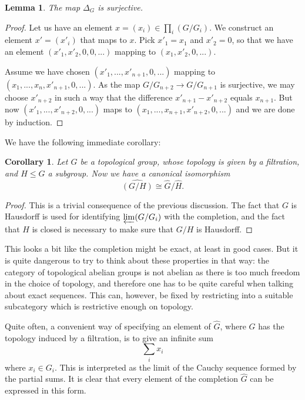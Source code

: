 \documentclass[12pt,a4paper,leqno]{article}
\newcommand{\plim}{\varprojlim}
\theoremstyle{plain}
\newtheorem{lem}[theo]{Lemma}
\newtheorem{cor}[theo]{Corollary}
\theoremstyle{definition}
\theoremstyle{remark}
\begin{document}
\begin{lem}
The map $\Delta_G$ is surjective. 
\end{lem}
\begin{proof}
Let us have an element $x = (x_i) \in \prod_i (G / G_i)$. We construct an element $x' = (x'_i)$ that maps to $x$. Pick $x'_1 = x_1$  and $x'_2 = 0$, so that we have an element $(x'_1, x'_2, 0, 0, ...)$ mapping to $(x_1, x'_2, 0, ...)$.

Assume we have chosen $(x'_1, ..., x'_{n+1}, 0 , ...)$ mapping to $(x_1,...,x_n,x'_{n+1},0,...)$. As the map $G / G_{n+2} \to G / G_{n+1}$ is surjective, we may choose $x'_{n+2}$ in such a way that the difference $x'_{n+1} - x'_{n+2}$ equals $x_{n+1}$. But now $(x'_1, ..., x'_{n+2},0 , ...)$ maps to $(x_1,...,x_{n+1}, x'_{n+2},0,...)$ and we are done by induction.
\end{proof}

We have the following immediate corollary:

\begin{cor}
Let $G$ be a topological group, whose topology is given by a filtration, and $H \leq G$ a subgroup. Now we have a canonical isomorphism 
\begin{equation*}
\widehat{(G/H)} \cong \widehat{G} / \widehat{H}.
\end{equation*}
\end{cor}
\begin{proof}
This is a trivial consequence of the previous discussion. The fact that $G$ is Hausdorff is used for identifying $\plim (G/G_i)$ with the completion, and the fact that $H$ is closed is necessary to make sure that $G/H$ is Hausdorff.
\end{proof}

This looks a bit like the completion might be exact, at least in good cases. But it is quite dangerous to try to think about these properties in that way: the category of topological abelian groups is not abelian as there is too much freedom in the choice of topology, and therefore one has to be quite careful when talking about exact sequences. This can, however, be fixed by restricting into a suitable subcategory which is restrictive enough on topology.

Quite often, a convenient way of specifying an element of $\widehat G$, where $G$ has the topology induced by a filtration, is to give an infinite sum
\begin{equation*}
\sum_i x_i
\end{equation*}
where $x_i \in G_i$. This is interpreted as the limit of the Cauchy sequence formed by the partial sums. It is clear that every element of the completion $\widehat G$ can be expressed in this form. 
\end{document}

